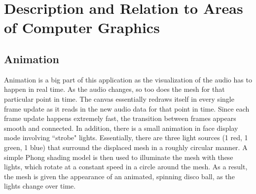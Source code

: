 \documentclass[12pt]{article}
\begin{document}
\section{Description and Relation to Areas of Computer Graphics}
\subsection{Animation}
Animation is a big part of this application as the visualization of the audio has to happen in real time. As the audio changes, so too does the mesh for that particular point in time. The canvas essentially redraws itself in every single frame update as it reads in the new audio data for that point in time. Since each frame update happens extremely fast, the transition between frames appears smooth and connected. In addition, there is a small animation in face display mode involving ``strobe" lights. Essentially, there are three light sources (1 red, 1 green, 1 blue) that surround the displaced mesh in a roughly circular manner. A simple Phong shading model is then used to illuminate the mesh with these lights, which rotate at a constant speed in a circle around the mesh. As a result, the mesh is given the appearance of an animated, spinning disco ball, as the lights change over time.
\end{document}
